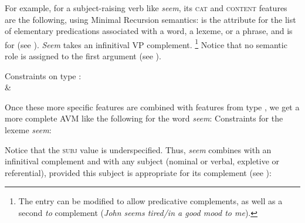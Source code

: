 \documentclass[output=paper
	        ,collection
	        ,collectionchapter
 	        ,biblatex
                ,babelshorthands
                ,newtxmath
                ,draftmode
                ,colorlinks, citecolor=brown
]{langscibook}
\begin{document}
For example, for a subject-raising verb like \emph{seem}, its \textsc{cat} and \textsc{content}
features are the following, using Minimal Recursion semantics\indexmrs:  is the
attribute for the list of elementary predications associated with a word, a lexeme, or a phrase, and
 is for  (see ). \emph{Seem} takes an infinitival VP complement.%
%
\footnote{The entry can be modified to allow predicative complements, as well as a second \emph{to} complement (\emph{John seems tired/in a good mood to me}).}
%
Notice that no semantic role is assigned to the first argument (see ).

\ea\label{ex:prop23}
Constraints on type :\\
 \impl {} \&\\
\z

\noindent
Once these more specific features are combined with features from type , we get a
more complete AVM like the following for the word \emph{seem}:
\ea\label{ex:prop24}
Constraints for the lexeme \emph{seem}:\\
\z

\noindent
Notice that the \textsc{subj} value is underspecified. Thus, \emph{seem} combines with an infinitival complement and with any subject (nominal or verbal, expletive or referential), provided this subject is appropriate for its complement (see ):
\end{document}
